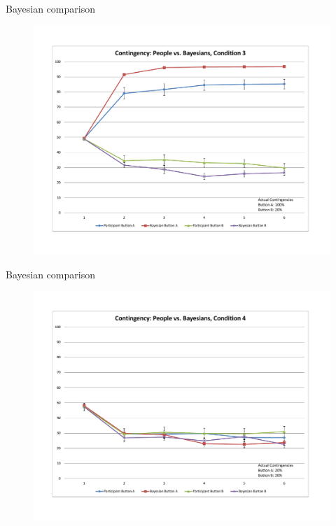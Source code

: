 \documentclass{beamer}
\begin{document}
\begin{frame}{Bayesian comparison}
	\begin{figure}
	\begin{center}
		\includegraphics[width=\linewidth]{learning3}
	\end{center}
	\end{figure}
\end{frame}


\begin{frame}{Bayesian comparison}
	\begin{figure}
	\begin{center}
		\includegraphics[width=\linewidth]{learning4}
	\end{center}
	\end{figure}
\end{frame}
\end{document}
